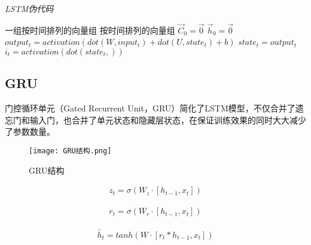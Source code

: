 \begin{algorithm}[!h]
  \caption{\emph{LSTM伪代码}}
  \begin{algorithmic}[1]
      \Require 一组按时间排列的向量组
      \Ensure 按时间排列的向量组
      \State $\vec C_0 = \vec 0$
      \State $\vec h_0 = \vec 0$
      \State $output_t = activation(dot(W, input_t) + dot(U, state_t) + b)$
      \State $state_t = output_t$
      \State $i_t = activation(dot(state_t,))$
      

      \EndFor
  \end{algorithmic}
\end{algorithm}


\subsection{GRU}
门控循环单元（Gated Recurrent Unit，GRU）简化了LSTM模型，不仅合并了遗忘门和输入门，也合并了单元状态和隐藏层状态，在保证训练效果的同时大大减少了参数数量。
\begin{figure}
    \centering
    \texttt{[image: GRU结构.png]}
    \caption{GRU结构}
    \label{fig:GRU结构}
  \end{figure}

  \begin{equation}
    \begin{aligned}
        z_t = \sigma(W_z\cdot [h_{t-1},x_t])
    \end{aligned}
\end{equation}

\begin{equation}
    \begin{aligned}
        r_t = \sigma(W_r\cdot[h_{t-1},x_t])
    \end{aligned}
\end{equation}

\begin{equation}
    \begin{aligned}
        \widetilde {h_t} = tanh(W\cdot[r_t * h_{t-1}, x_t])
    \end{aligned}
\end{equation}

